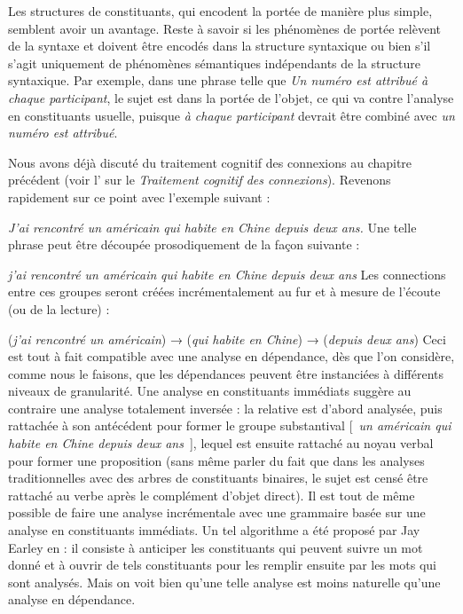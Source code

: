 {    Les structures de constituants, qui encodent la portée de manière plus simple, semblent avoir un avantage. Reste à savoir si les phénomènes de portée relèvent de la syntaxe et doivent être encodés dans la structure syntaxique ou bien s’il s’agit uniquement de phénomènes sémantiques indépendants de la structure syntaxique. Par exemple, dans une phrase telle que \textit{Un numéro est attribué à chaque participant}, le sujet est dans la portée de l’objet, ce qui va contre l’analyse en constituants usuelle, puisque \textit{à chaque participant} devrait être combiné avec \textit{un numéro est attribué}.

    Nous avons déjà discuté du traitement cognitif des connexions au chapitre précédent (voir l' sur le \textit{Traitement cognitif des connexions}). Revenons rapidement sur ce point avec l’exemple suivant :

    \ea
    \textit{{J’ai rencontré un américain qui habite en Chine depuis deux ans.}}
    \z
    Une telle phrase peut être découpée prosodiquement de la façon suivante :

    \ea
    \textit{{j’ai rencontré un américain}} {\textbar} \textit{qui habite en Chine} {\textbar} \textit{depuis deux ans}
    \z
    Les connections entre ces groupes seront créées incrémentalement au fur et à mesure de l’écoute (ou de la lecture) :
    
    \ea
    (\textit{j’ai rencontré un américain}) \textrm{→} (\textit{qui habite en Chine}) \textrm{→} (\textit{depuis deux ans})
    \z
    Ceci est tout à fait compatible avec une analyse en dépendance, dès que l'on considère, comme nous le faisons, que les dépendances peuvent être instanciées à différents niveaux de granularité. Une analyse en constituants immédiats suggère au contraire une analyse totalement inversée : la relative est d’abord analysée, puis rattachée à son antécédent pour former le groupe substantival [~\textit{un américain qui habite en Chine depuis deux ans}~], lequel est ensuite rattaché au noyau verbal pour former une proposition (sans même parler du fait que dans les analyses traditionnelles avec des arbres de constituants binaires, le sujet est censé être rattaché au verbe après le complément d’objet direct).
    Il est tout de même possible de faire une analyse incrémentale avec une grammaire basée sur une analyse en constituants immédiats. Un tel algorithme a été proposé par Jay Earley en \citeyear{earley1970efficient} : il consiste à anticiper les constituants qui peuvent suivre un mot donné et à ouvrir de tels constituants pour les remplir ensuite par les mots qui sont analysés. Mais on voit bien qu’une telle analyse est moins naturelle qu’une analyse en dépendance.
}
